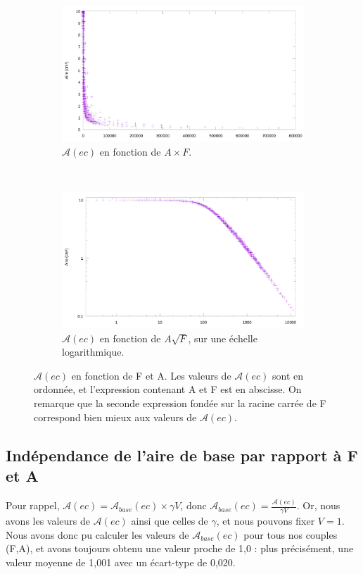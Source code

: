 	\begin{figure}[!htb]
		\centering
		\begin{subfigure}[t]{\textwidth}
			\centering
			\includegraphics[width=\textwidth]{figures/ch4/af2area}
			\caption{$\mathcal{A}(ec)$ en fonction de $A\times{}F$.}
			\label{fig:af2area}
		\end{subfigure}
		~
		\begin{subfigure}[t]{\textwidth}
			\centering
			\includegraphics[width=\textwidth]{figures/ch4/af2areaLogLog}
			\caption{$\mathcal{A}(ec)$ en fonction de $A\sqrt{F}$, sur une échelle logarithmique.}
			\label{fig:af2areaLogLog}
		\end{subfigure}
		\caption[$\mathcal{A}(ec)$ en fonction de F et A, bis]{$\mathcal{A}(ec)$ en fonction de F et A. Les valeurs de $\mathcal{A}(ec)$ sont en ordonnée, et l'expression contenant A et F est en abscisse. On remarque que la seconde expression fondée sur la racine carrée de F correspond bien mieux aux valeurs de $\mathcal{A}(ec)$.}
		\label{fig:areaVentropy}
	\end{figure}
	
	\subsection{Indépendance de l'aire de base par rapport à F et A}
	Pour rappel, $\mathcal{A}(ec) = \mathcal{A}_{base}(ec) \times \gamma{}V$, donc $\mathcal{A}_{base}(ec) = \frac{\mathcal{A}(ec)}{\gamma{}V}$. Or, nous avons les valeurs de $\mathcal{A}(ec)$ ainsi que celles de $\gamma$, et nous pouvons fixer $V = 1$. Nous avons donc pu calculer les valeurs de $\mathcal{A}_{base}(ec)$ pour tous nos couples (F,A), et avons toujours obtenu une valeur proche de 1,0 : plus précisément, une valeur moyenne de 1,001 avec un écart-type de 0,020.
	
